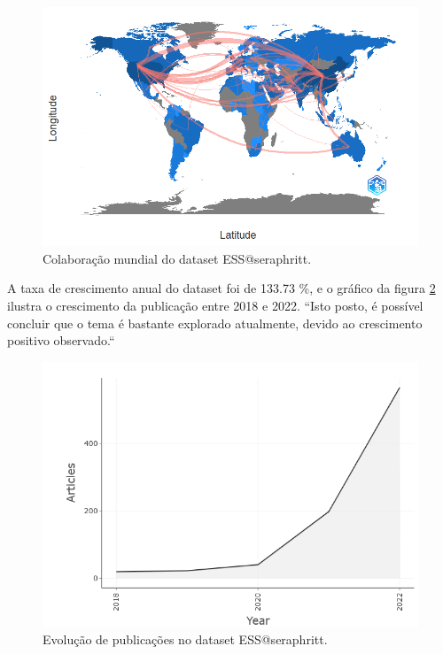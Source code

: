 \begin{figure}
    \centering
    \includegraphics[width=\textwidth]{exploratory-data-analysis/seraphritt/PesqBibliogr/Virus-Network/world.png}
    \caption{Colaboração mundial do dataset ESS@seraphritt.}
    \label{ESS@seraphritt-world}
\end{figure}

A taxa de crescimento anual do dataset foi de 133.73 \%, e o gráfico da figura \ref{ESS@seraphritt-Crescimento} ilustra o crescimento da publicação entre 2018 e 2022. ``Isto posto, é possível concluir que o tema é bastante explorado atualmente, devido ao crescimento positivo observado.``

\begin{figure}
    \centering
    \includegraphics[width=\textwidth]{exploratory-data-analysis/seraphritt/PesqBibliogr/Virus-Network/newplot.png}
    \caption{Evolução de publicações no dataset ESS@seraphritt.}
    \label{ESS@seraphritt-Crescimento}
\end{figure}

